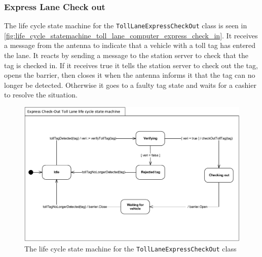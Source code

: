 \subsubsection*{Express Lane Check out}
The life cycle state machine for the \texttt{TollLaneExpressCheckOut} class is seen in \autoref{fig:life_cycle_statemachine_toll_lane_computer_express_check_in}. It receives a message from the antenna to indicate that a vehicle with a toll tag has entered the lane. It reacts by sending a message to the station server to check that the tag is checked in. If it receives true it tells the station server to check out the tag, opens the barrier, then closes it when the antenna informs it that the tag can no longer be detected.  Otherwise it goes to a faulty tag state and waits for a cashier to resolve the situation. 
\begin{figure}[H]
\centering
\includegraphics[width=0.7\linewidth]{img/behaviour_state_machines/life_cycle_state_machines/life_cycle_statemachine_toll_lane_computer_express_check_out}
\caption{The life cycle state machine for the \texttt{TollLaneExpressCheckOut} class}
\label{fig:life_cycle_statemachine_toll_lane_computer_express_check_out}
\end{figure}

